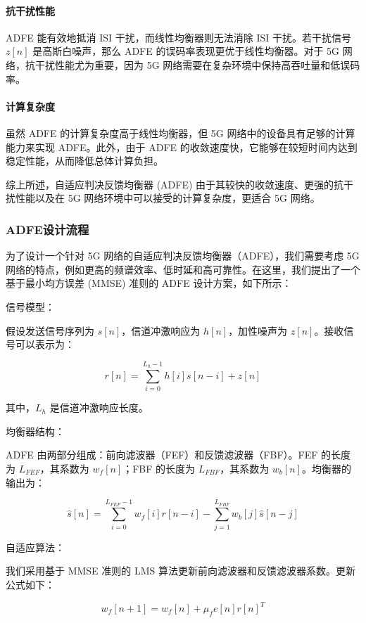 \documentclass[UTF8,a4paper,12pt]{ctexart}
\numberwithin{equation}{section}
\begin{document}
\paragraph{抗干扰性能}

ADFE 能有效地抵消 ISI 干扰，而线性均衡器则无法消除 ISI 干扰。若干扰信号 $z[n]$ 是高斯白噪声，那么 ADFE 的误码率表现更优于线性均衡器。对于 5G 网络，抗干扰性能尤为重要，因为 5G 网络需要在复杂环境中保持高吞吐量和低误码率。

\paragraph{计算复杂度}
虽然 ADFE 的计算复杂度高于线性均衡器，但 5G 网络中的设备具有足够的计算能力来实现 ADFE。此外，由于 ADFE 的收敛速度快，它能够在较短时间内达到稳定性能，从而降低总体计算负担。

综上所述，自适应判决反馈均衡器 (ADFE) 由于其较快的收敛速度、更强的抗干扰性能以及在 5G 网络环境中可以接受的计算复杂度，更适合 5G 网络。
\subsubsection{ADFE设计流程}
为了设计一个针对 5G 网络的自适应判决反馈均衡器（ADFE），我们需要考虑 5G 网络的特点，例如更高的频谱效率、低时延和高可靠性。在这里，我们提出了一个基于最小均方误差 (MMSE) 准则的 ADFE 设计方案，如下所示：

信号模型：

假设发送信号序列为 $s[n]$，信道冲激响应为 $h[n]$，加性噪声为 $z[n]$。接收信号可以表示为：

\begin{equation}
	r[n] = \sum_{i=0}^{L_h-1} h[i]s[n-i] + z[n]
\end{equation}

其中，$L_h$ 是信道冲激响应长度。

均衡器结构：

ADFE 由两部分组成：前向滤波器（FEF）和反馈滤波器（FBF）。FEF 的长度为 $L_{FEF}$，其系数为 $w_f[n]$；FBF 的长度为 $L_{FBF}$，其系数为 $w_b[n]$。均衡器的输出为：

\begin{equation}
	\hat{s}[n] = \sum_{i=0}^{L_{FEF}-1} w_f[i]r[n-i] - \sum_{j=1}^{L_{FBF}} w_b[j] \hat{s}[n-j]
\end{equation}

自适应算法：

我们采用基于 MMSE 准则的 LMS 算法更新前向滤波器和反馈滤波器系数。更新公式如下：

\begin{equation}
	w_f[n+1] = w_f[n] + \mu_f e[n] r[n]^{T}
\end{equation}
\end{document}
